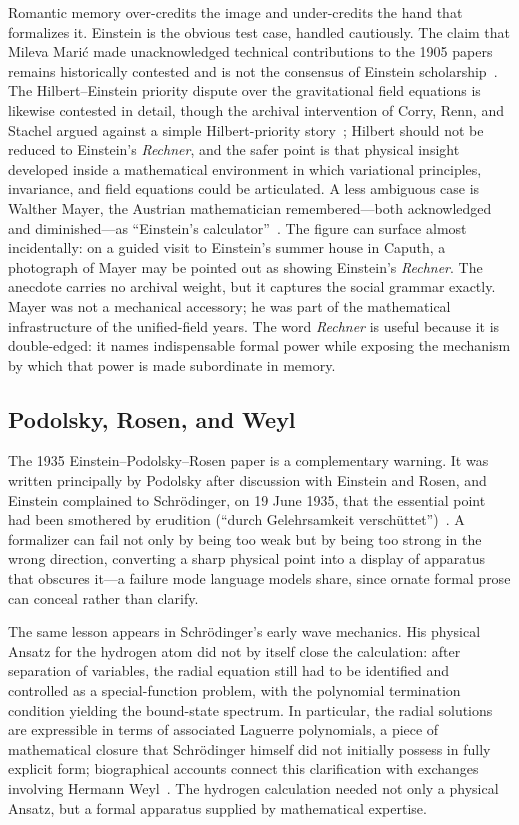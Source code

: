 \documentclass[
  aps,
  reprint,
  superscriptaddress,
  floatfix,
  nofootinbib,
  longbibliography
]{revtex4-2}
\begin{document}
Romantic memory over-credits the image and under-credits the hand that formalizes
it. Einstein is the obvious test case, handled cautiously. The claim that Mileva
Mari\'c made unacknowledged technical contributions to the 1905 papers remains
historically contested and is not the consensus of Einstein
scholarship~\cite{stachel2002}. The Hilbert--Einstein priority dispute over the
gravitational field equations is likewise contested in detail, though the
archival intervention of Corry, Renn, and Stachel argued against a simple
Hilbert-priority story~\cite{corry1997}; Hilbert should not be reduced to
Einstein's \emph{Rechner}, and the safer point is that physical insight developed
inside a mathematical environment in which variational principles, invariance,
and field equations could be articulated. A less ambiguous case is Walther Mayer,
the Austrian mathematician remembered---both acknowledged and diminished---as
``Einstein's calculator''~\cite{pais,lessel2023}. The figure can surface almost
incidentally: on a guided visit to Einstein's summer house in Caputh, a
photograph of Mayer may be pointed out as showing Einstein's \emph{Rechner}. The
anecdote carries no archival weight, but it captures the social grammar exactly.
Mayer was not a mechanical accessory; he was part of the mathematical
infrastructure of the unified-field years. The word \emph{Rechner} is useful
because it is double-edged: it names indispensable formal power while exposing the
mechanism by which that power is made subordinate in memory.

\subsection{Podolsky, Rosen, and Weyl}

The 1935 Einstein--Podolsky--Rosen paper is a complementary warning. It was
written principally by Podolsky after discussion with Einstein and Rosen, and
Einstein complained to Schr\"odinger, on 19 June 1935, that the essential point
had been smothered by erudition (``durch Gelehrsamkeit
versch\"uttet'')~\cite{epr,fine-sh}. A formalizer can fail not only by being too
weak but by being too strong in the wrong direction, converting a sharp physical
point into a display of apparatus that obscures it---a failure mode language
models share, since ornate formal prose can conceal rather than clarify.

The same lesson appears in Schr\"odinger's early wave mechanics.  His physical
Ansatz for the hydrogen atom did not by itself close the calculation: after
separation of variables, the radial equation still had to be identified and
controlled as a special-function problem, with the polynomial termination
condition yielding the bound-state spectrum.  In particular, the radial
solutions are expressible in terms of associated Laguerre polynomials, a piece
of mathematical closure that Schr\"odinger himself did not initially possess in
fully explicit form; biographical accounts connect this clarification with
exchanges involving Hermann Weyl~\cite{ANDP:ANDP19263840404,Moore-Schroedinger}.
The hydrogen calculation needed not only a physical Ansatz, but a formal
apparatus supplied by mathematical expertise.
\end{document}
